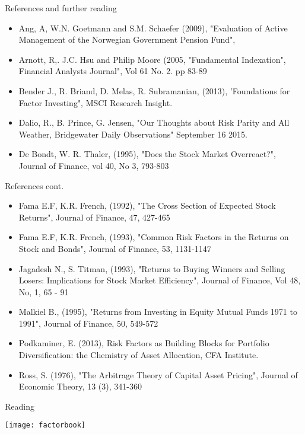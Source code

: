 \documentclass[14pt,xcolor=pdftex,dvipsnames,table]{beamer}\usepackage[]{graphicx}\usepackage[]{color}
\begin{document}
\begin{frame}{References and further reading}
\begin{itemize}
\item Ang, A, W.N. Goetmann and S.M. Schaefer (2009), "Evaluation of Active Management of the Norwegian Government Pension Fund",

\item Arnott, R,. J.C. Hsu and Philip Moore (2005, "Fundamental Indexation", Financial Analysts Journal", Vol 61 No. 2. pp 83-89

\item Bender J., R. Briand, D. Melas, R. Subramanian, (2013), 'Foundations for Factor Investing", MSCI Research Insight. 

\item Dalio, R., B. Prince, G. Jensen, "Our Thoughts about Risk Parity and All Weather, Bridgewater Daily Observations" September 16 2015.

\item De Bondt, W. R. Thaler, (1995), "Does the Stock Market Overreact?", Journal of Finance, vol 40, No 3, 793-803 

\end{itemize}
\end{frame}

\begin{frame}{References cont.}
\begin{itemize}
\item Fama E.F, K.R. French, (1992), "The Cross Section of Expected Stock Returns", Journal of Finance, 47, 427-465

\item Fama E.F, K.R. French, (1993), "Common Risk Factors in the Returns on Stock and Bonds", Journal of Finance, 53, 1131-1147

\item Jagadesh N., S. Titman, (1993), "Returns to Buying Winners and Selling Losers: Implications for Stock Market Efficiency", Journal of Finance, Vol 48, No, 1, 65 -  91

\item Malkiel B., (1995), "Returns from Investing in Equity Mutual Funds 1971 to 1991", Journal of Finance, 50, 549-572

\item Podkaminer, E. (2013), Risk Factors as Building Blocks for Portfolio Diversification: the Chemistry of Asset Allocation, CFA Institute. 

\item Ross, S. (1976), "The Arbitrage Theory of Capital Asset Pricing", Journal of Economic Theory, 13 (3), 341-360

\end{itemize}
\end{frame}

\begin{frame}{Reading}
\begin{center}
\texttt{[image: factorbook]}
\end{center}
\end{frame}
\end{document}
